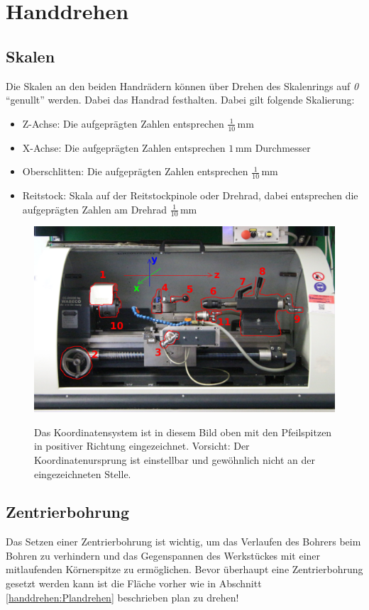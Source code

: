 \documentclass{\basedir/fablab-document}
\begin{document}
\newpage
\section{Handdrehen}
\label{handdrehen}
\subsection{Skalen}

Die Skalen an den beiden Handrädern können über Drehen des Skalenrings auf \emph{0} \enquote{genullt} werden.
Dabei das Handrad festhalten.
Dabei gilt folgende Skalierung:
\begin{itemize}
\item Z-Achse: Die aufgeprägten Zahlen entsprechen $\frac{1}{10}$\,mm 
\item X-Achse: Die aufgeprägten Zahlen entsprechen $1$\,mm Durchmesser
\item Oberschlitten: Die aufgeprägten Zahlen entsprechen $\frac{1}{10}$\,mm 
\item Reitstock: Skala auf der Reitstockpinole oder Drehrad, dabei entsprechen die aufgeprägten Zahlen am Drehrad $\frac{1}{10}$\,mm
\end{itemize}

\begin{figure}[ht]
\centering
\includegraphics[width = 0.9\linewidth]{img/drehbank-uebersicht-beschreibung} \\
\caption{Das Koordinatensystem ist in diesem Bild oben mit den Pfeilspitzen in positiver Richtung eingezeichnet. Vorsicht: Der Koordinatenursprung ist einstellbar und gewöhnlich nicht an der eingezeichneten Stelle.}
\end{figure}


\subsection{Zentrierbohrung}
\label{handdrehen:zentrierbohrung}
Das Setzen einer Zentrierbohrung ist wichtig, um das Verlaufen des Bohrers beim Bohren zu verhindern
und das Gegenspannen des Werkstückes mit einer mitlaufenden Körnerspitze zu ermöglichen.
Bevor überhaupt eine Zentrierbohrung gesetzt werden kann ist die Fläche vorher wie in
Abschnitt \ref{handdrehen:Plandrehen} beschrieben plan zu drehen!
\end{document}

